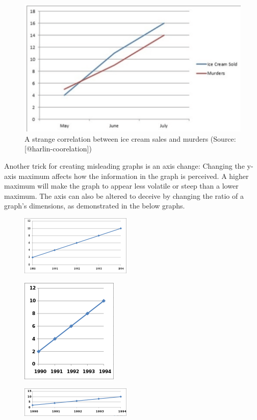 \documentclass[]{book}
\theoremstyle{definition}
\theoremstyle{definition}
\theoremstyle{definition}
\theoremstyle{remark}
\begin{document}
\begin{figure}
\includegraphics[width=0.7\linewidth]{images/harlin-ice-cream} \caption{A strange correlation between ice cream sales and murders (Source: [@harlin-coorelation])}\label{fig:harlin-ice-cream}
\end{figure}

Another trick for creating misleading graphs is an axis change: Changing
the y-axis maximum affects how the information in the graph is
perceived. A higher maximum will make the graph to appear less volatile
or steep than a lower maximum. The axis can also be altered to deceive
by changing the ratio of a graph's dimensions, as demonstrated in the
below graphs.

\begin{figure}
\centering
\includegraphics{images/Line_graph1.svg.png}
\caption{}
\end{figure}

\begin{figure}
\centering
\includegraphics{images/175px-Line_graph1-3.svg.png}
\caption{}
\end{figure}

\begin{figure}
\centering
\includegraphics{images/200px-Line_graph1-4.svg.png}
\caption{}
\end{figure}
\end{document}
